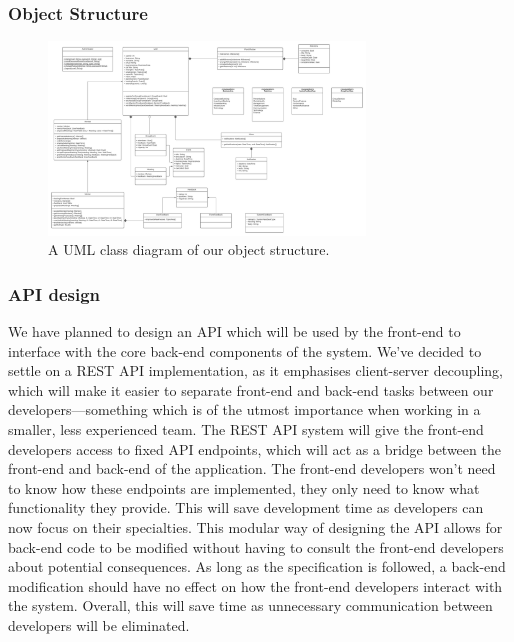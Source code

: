 \documentclass[10pt]{article}
\begin{document}
\subsubsection{Object Structure}

\begin{figure}[H]
    \centering
    \includegraphics[width=0.75\textwidth]{Objects}
    \caption{A UML class diagram of our object structure.}
    \label{fig:uml_class_diagram}
\end{figure}


\subsubsection{API design}
We have planned to design an API which will be used by the front-end to
interface with the core back-end components of the system. We've decided to
settle on a REST API implementation, as it emphasises client-server decoupling,
which will make it easier to separate front-end and back-end tasks between our
developers—something which is of the utmost importance when working in a
smaller, less experienced team. The REST API system will give the front-end
developers access to fixed API endpoints, which will act as a bridge between the
front-end and back-end of the application. The front-end developers won't need
to know how these endpoints are implemented, they only need to know what
functionality they provide. This will save development time as developers can
now focus on their specialties. This modular way of designing the API allows for
back-end code to be modified without having to consult the front-end developers
about potential consequences. As long as the specification is followed, a
back-end modification should have no effect on how the front-end developers
interact with the system. Overall, this will save time as unnecessary
communication between developers will be eliminated.
\end{document}
